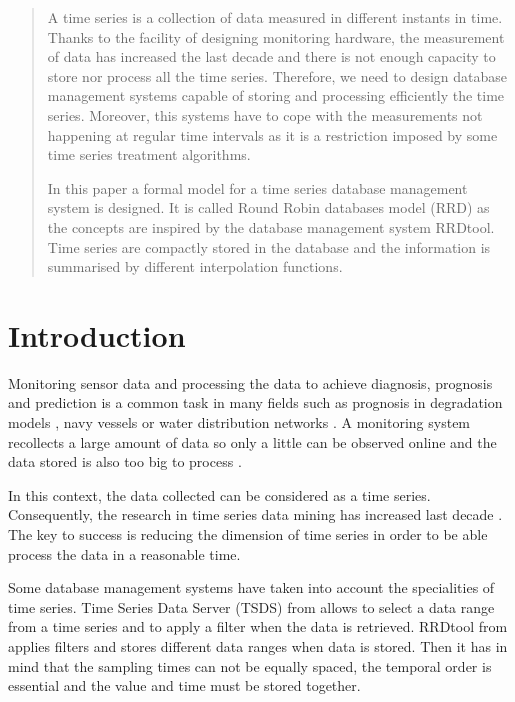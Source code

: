 \begin{abstract}
  A time series is a collection of data measured in different instants
  in time. Thanks to the facility of designing monitoring hardware,
  the measurement of data has increased the last decade and there is
  not enough capacity to store nor process all the time
  series. Therefore, we need to design database management systems
  capable of storing and processing efficiently the time
  series. Moreover, this systems have to cope with the measurements
  not happening at regular time intervals as it is a restriction
  imposed by some time series treatment algorithms.

  In this paper a formal model for a time series database management
  system is designed.  It is called Round Robin databases model (RRD)
   as the concepts are
  inspired by the database management system RRDtool. Time series are
  compactly stored in the database and the information is summarised
  by different interpolation functions.
\end{abstract}

\section{Introduction}

Monitoring sensor data and processing the data to achieve diagnosis,
prognosis and prediction is a common task in many fields such as
prognosis in degradation models \parencite{yu11}, navy
vessels \parencite{palmer07} or water distribution
networks \parencite{quevedo10}.  A monitoring system recollects a
large amount of data so only a little can be observed online and the
data stored is also too big to process \parencite{keogh97}.

In this context, the data collected can be considered as a time
series. Consequently, the research in time series data mining has
increased last decade \parencite{fu11}.  The key to success is
reducing the dimension of time series in order to be able process the
data in a reasonable time.

Some database management systems have taken into account the
specialities of time series.  Time Series Data Server (TSDS) from
\cite{weigel10} allows to select a data range from a time series and
to apply a filter when the data is retrieved.  RRDtool from
\cite{rrdtool} applies filters and stores different data ranges when
data is stored. Then it has in mind that the sampling times can not be
equally spaced, the temporal order is essential and the value and time
must be stored together. 

